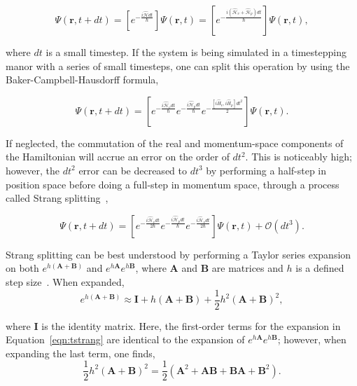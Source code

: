 \begin{equation}
\Psi(\mathbf{r},t + dt) = \left[e^{-\frac{i\mathcal{\hat{H}}dt}{\hbar}}\right]\Psi(\mathbf{r},t) = \left[e^{-\frac{i(\mathcal{\hat{H}}_v + \mathcal{\hat{H}}_p)dt}{\hbar}}\right]\Psi(\mathbf{r},t),
\end{equation}

\noindent where $dt$ is a small timestep.
If the system is being simulated in a timestepping manor with a series of small timesteps, one can split this operation by using the Baker-Campbell-Hausdorff formula,

\begin{equation}
\Psi(\mathbf{r},t+dt) = \left[e^{-\frac{i\mathcal{\hat{H}}_vdt}{\hbar}}e^{-\frac{i\mathcal{\hat{H}}_pdt}{\hbar}}e^{-\frac{[i\hat{H}_v, i\hat{H}_p]dt^2}{2}}\right]\Psi(\mathbf{r},t).
\label{eqn:rsolve}
\end{equation}

\noindent If neglected, the commutation of the real and momentum-space components of the Hamiltonian will accrue an error on the order of $dt^2$.
This is noticeably high;
however, the $dt^2$ error can be decreased to $dt^3$ by performing a half-step in position space before doing a full-step in momentum space, through a process called Strang splitting~\cite{strang1968},

\begin{equation}
\Psi(\mathbf{r},t+dt) = \left[e^{-\frac{i\mathcal{\hat{H}}_vdt}{2\hbar}}e^{-\frac{i\mathcal{\hat{H}}_pdt}{\hbar}}e^{-\frac{i\mathcal{\hat{H}}_vdt}{2\hbar}} \right]\Psi(\mathbf{r},t) + \mathcal{O}(dt^3).
\end{equation}

Strang splitting can be best understood by performing a Taylor series expansion on both $e^{h(\mathbf{A}+\mathbf{B})}$ and $e^{h\mathbf{A}}e^{h\mathbf{B}}$, where $\mathbf{A}$ and $\mathbf{B}$ are matrices and $h$ is a defined step size~\cite{macnamara2016}.
When expanded,
\begin{equation}
e^{h(\mathbf{A}+\mathbf{B})} \approx \mathbf{I} + h(\mathbf{A} + \mathbf{B}) + \frac{1}{2}h^2(\mathbf{A} + \mathbf{B})^2,
\label{eqn:tstrang}
\end{equation}

\noindent where $\mathbf{I}$ is the identity matrix.
Here, the first-order terms for the expansion in Equation~\eqref{eqn:tstrang} are identical to the expansion of $e^{h\mathbf{A}}e^{h\mathbf{B}}$; however, when expanding the last term, one finds,
\begin{equation}
\frac{1}{2}h^2(\mathbf{A} + \mathbf{B})^2 = \frac{1}{2}\left( \mathbf{A}^2 + \mathbf{AB} + \mathbf{BA} + \mathbf{B}^2\right).
\end{equation}

